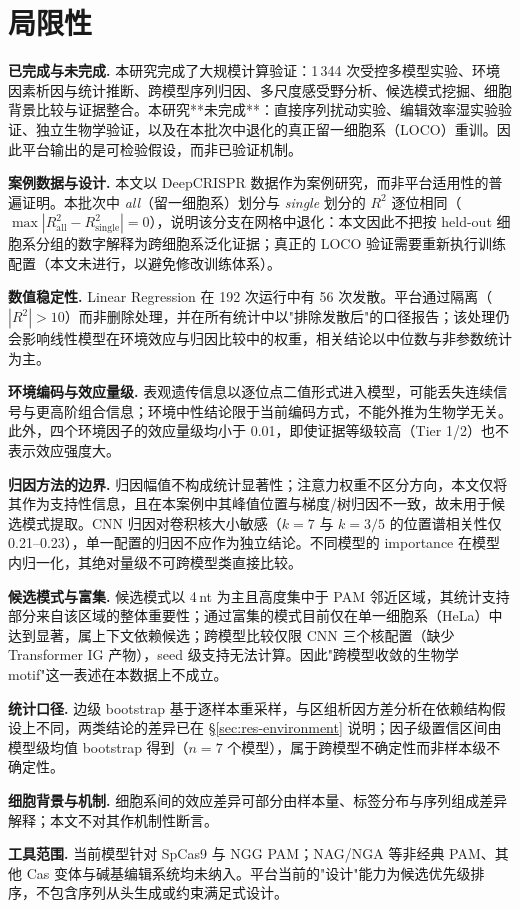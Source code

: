 \section{局限性}
\label{sec:limitations}

\textbf{已完成与未完成.} 本研究完成了大规模计算验证：1\,344 次受控多模型实验、环境因素析因与统计推断、跨模型序列归因、多尺度感受野分析、候选模式挖掘、细胞背景比较与证据整合。本研究**未完成**：直接序列扰动实验、编辑效率湿实验验证、独立生物学验证，以及在本批次中退化的真正留一细胞系（LOCO）重训。因此平台输出的是可检验假设，而非已验证机制。

\textbf{案例数据与设计.} 本文以 DeepCRISPR 数据作为案例研究，而非平台适用性的普遍证明。本批次中 \emph{all}（留一细胞系）划分与 \emph{single} 划分的 $R^{2}$ 逐位相同（$\max|R^{2}_{\text{all}}-R^{2}_{\text{single}}|=0$），说明该分支在网格中退化：本文因此不把按 held-out 细胞系分组的数字解释为跨细胞系泛化证据；真正的 LOCO 验证需要重新执行训练配置（本文未进行，以避免修改训练体系）。

\textbf{数值稳定性.} Linear Regression 在 192 次运行中有 56 次发散。平台通过隔离（$|R^{2}|>10$）而非删除处理，并在所有统计中以"排除发散后"的口径报告；该处理仍会影响线性模型在环境效应与归因比较中的权重，相关结论以中位数与非参数统计为主。

\textbf{环境编码与效应量级.} 表观遗传信息以逐位点二值形式进入模型，可能丢失连续信号与更高阶组合信息；环境中性结论限于当前编码方式，不能外推为生物学无关。此外，四个环境因子的效应量级均小于 0.01，即使证据等级较高（Tier 1/2）也不表示效应强度大。

\textbf{归因方法的边界.} 归因幅值不构成统计显著性；注意力权重不区分方向，本文仅将其作为支持性信息，且在本案例中其峰值位置与梯度/树归因不一致，故未用于候选模式提取。CNN 归因对卷积核大小敏感（$k=7$ 与 $k=3/5$ 的位置谱相关性仅 0.21--0.23），单一配置的归因不应作为独立结论。不同模型的 importance 在模型内归一化，其绝对量级不可跨模型类直接比较。

\textbf{候选模式与富集.} 候选模式以 4\,nt 为主且高度集中于 PAM 邻近区域，其统计支持部分来自该区域的整体重要性；通过富集的模式目前仅在单一细胞系（HeLa）中达到显著，属上下文依赖候选；跨模型比较仅限 CNN 三个核配置（缺少 Transformer IG 产物），seed 级支持无法计算。因此"跨模型收敛的生物学 motif"这一表述在本数据上不成立。

\textbf{统计口径.} 边级 bootstrap 基于逐样本重采样，与区组析因方差分析在依赖结构假设上不同，两类结论的差异已在 \S\ref{sec:res-environment} 说明；因子级置信区间由模型级均值 bootstrap 得到（$n=7$ 个模型），属于跨模型不确定性而非样本级不确定性。

\textbf{细胞背景与机制.} 细胞系间的效应差异可部分由样本量、标签分布与序列组成差异解释；本文不对其作机制性断言。

\textbf{工具范围.} 当前模型针对 SpCas9 与 NGG PAM；NAG/NGA 等非经典 PAM、其他 Cas 变体与碱基编辑系统均未纳入。平台当前的"设计"能力为候选优先级排序，不包含序列从头生成或约束满足式设计。
